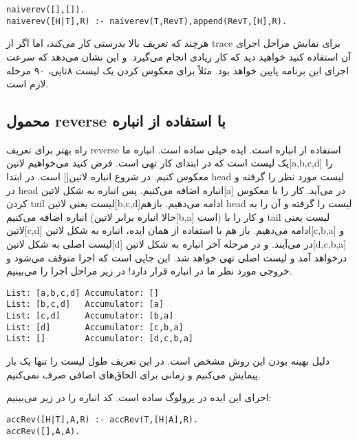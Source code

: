 \begin{latin}
\begin{lstlisting}
naiverev([],[]).
naiverev([H|T],R) :- naiverev(T,RevT),append(RevT,[H],R).
\end{lstlisting}
\end{latin}

هرچند که تعریف بالا بدرستی کار می‌کند، اما اگر از trace برای نمایش مراحل اجرای آن استفاده کنید خواهید دید که کار زیادی انجام می‌گیرد. و این نشان می‌دهد که سرعت اجرای این برنامه پایین خواهد بود. مثلاً برای معکوس کردن یک لیست ۸تایی، ۹۰ مرحله لازم است.

\subsection{محمول reverse با استفاده از انباره}
راه بهتر برای تعریف reverse استفاده از انباره است. ایده خیلی ساده است. انباره ما یک لیست است که در ابتدای کار تهی است. فرض کنید می‌خواهیم ‌لاتین{[a,b,c,d]} را معکوس کنیم. در شروع انباره ‌لاتین{[]} است. در ابتدا head لیست مورد نظر را گرفته و در head انباره اضافه می‌کنیم. پس انباره به شکل ‌لاتین{[a]} در می‌آید. کار را با معکوس کردن tail لیست یعنی ‌لاتین{[b,c,d]}ادامه می‌دهیم. بازهم head لیست را گرفته و آن را به انباره اضافه می‌کنیم (حالا انباره برابر ‌لاتین{[b,a]} است) و کار را با tail لیست یعنی ‌لاتین{[c,d]} ادامه می‌دهیم. باز هم با استفاده از همان ایده، انباره به شکل ‌لاتین{[c,b,a]} و لیست اصلی به شکل ‌لاتین{[d]} در می‌آیند. و در مرحله آخر انباره به شکل ‌لاتین{[d,c,b,a]} درخواهد آمد و لیست اصلی تهی خواهد شد. این جایی است که اجرا متوقف می‌شود و خروجی مورد نظر ما در انباره قرار دارد! در زیر مراحل اجرا را می‌بینیم.

\begin{latin}
\begin{lstlisting}
List: [a,b,c,d] Accumulator: []
List: [b,c,d]   Accumulator: [a]
List: [c,d]     Accumulator: [b,a]
List: [d]       Accumulator: [c,b,a]
List: []        Accumulator: [d,c,b,a]
\end{lstlisting}
\end{latin}

دلیل بهینه بودن این روش مشخص است. در این تعریف طول لیست را تنها یک بار پیمایش می‌کنیم و زمانی برای الحاق‌های اضافی صرف نمی‌کنیم.

اجرای این ایده در پرولوگ ساده است. کد انباره را در زیر می‌بینیم:
\begin{latin}
\begin{lstlisting}
accRev([H|T],A,R) :- accRev(T,[H|A],R).
accRev([],A,A).
\end{lstlisting}
\end{latin}

